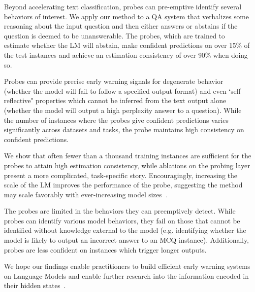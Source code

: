 Beyond accelerating text classification, probes can pre-emptive identify several behaviors of interest. We apply our method to a QA system that verbalizes some reasoning about the input question and then either answers or abstains if the question is deemed to be unanswerable. The probes, which are trained to estimate whether the LM will abstain, make confident predictions on over 15\% of the test instances and achieve an estimation consistency of over 90\% when doing so.

Probes can provide precise early warning signals for degenerate behavior (whether the model will fail to follow a specified output format) and even `self-reflective" properties which cannot be inferred from the text output alone (whether the model will output a high perplexity answer to a question).
While the number of instances where the probes give confident predictions varies significantly across datasets and tasks, the probe maintains high consistency on confident predictions.  

We show that often fewer than a thousand training instances are sufficient for the probes to attain high estimation consistency, while ablations on the probing layer present a more complicated, task-specific story. Encouragingly, increasing the scale of the LM improves the performance of the probe, suggesting the method may scale favorably with ever-increasing model sizes~\citep{brown2020language, hoffmann2022an,  chowdhery2023palm, dubey2024llama}. 

The probes are limited in the behaviors they can preemptively detect. While probes can identify various model behaviors, they fail on those that cannot be identified without knowledge external to the model (e.g. identifying whether the model is likely to output an incorrect answer to an MCQ instance). Additionally, probes are less confident on instances which trigger longer outputs. 

We hope our findings enable practitioners to build efficient early warning systems on Language Models and enable further research into the information encoded in their hidden states~\citep{petroni2019language, azaria-mitchell-2023-internal, nylund-etal-2024-time}. 


